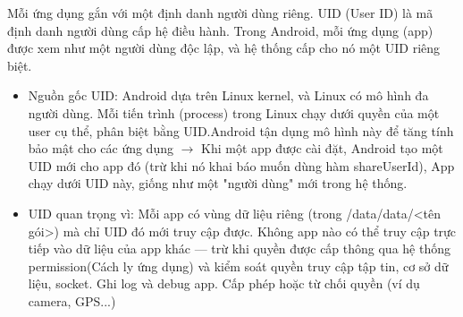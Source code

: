 \renewcommand{\labelitemi}{--}    
    \begin{flushleft}
        \hspace*{0.8cm}Mỗi ứng dụng gắn với một định danh người dùng riêng. UID (User ID) là mã định danh người dùng cấp hệ điều hành. Trong Android, mỗi ứng dụng (app) được xem như một người dùng độc lập, và hệ thống cấp cho nó một UID riêng biệt.
        \setlength{\leftmargini}{1.5cm}
        \begin{itemize}
            \item Nguồn gốc UID: Android dựa trên Linux kernel, và Linux có mô hình đa người dùng. Mỗi tiến trình (process) trong Linux chạy dưới quyền của một user cụ thể, phân biệt bằng UID.Android tận dụng mô hình này để tăng tính bảo mật cho các ứng dụng $\rightarrow$ Khi một app được cài đặt, Android tạo một UID mới cho app đó (trừ khi nó khai báo muốn dùng hàm shareUserId), App chạy dưới UID này, giống như một "người dùng" mới trong hệ thống.
            \item UID quan trọng vì: Mỗi app có vùng dữ liệu riêng (trong /data/data/<tên gói>) mà chỉ UID đó mới truy cập được. Không app nào có thể truy cập trực tiếp vào dữ liệu của app khác — trừ khi quyền được cấp thông qua hệ thống permission(Cách ly ứng dụng) và kiểm soát quyền truy cập tập tin, cơ sở dữ liệu, socket. Ghi log và debug app. Cấp phép hoặc từ chối quyền (ví dụ camera, GPS...)
        \end{itemize}
    \end{flushleft}

